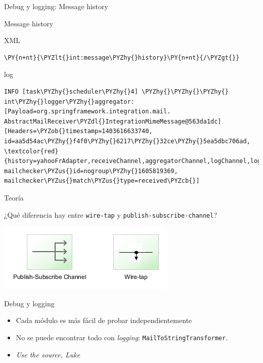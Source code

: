 \documentclass{beamer}
\begin{document}
\begin{frame}[fragile]{Debug y logging: Message history}
\begin{center}
Message history
\end{center}
{\small XML}
\begin{Verbatim}[fontsize=\tiny,commandchars=\\\{\}]
\PY{n+nt}{\PYZlt{}int:message\PYZhy{}history}\PY{n+nt}{/\PYZgt{}}
\end{Verbatim}

{\small log}
\begin{Verbatim}[fontsize=\tiny,commandchars=\\\{\}]
INFO [task\PYZhy{}scheduler\PYZhy{}4] \PYZhy{}\PYZhy{}\PYZhy{} int\PYZhy{}logger\PYZhy{}aggregator: [Payload=org.springframework.integration.mail.
AbstractMailReceiver\PYZdl{}IntegrationMimeMessage@563da1dc][Headers=\PYZob{}timestamp=1403616633740, id=aa5d54ac\PYZhy{}f4f0\PYZhy{}6217\PYZhy{}32ce\PYZhy{}5ea5dbc706ad,
\textcolor{red}{history=yahooFrAdapter,receiveChannel,aggregatorChannel,logChannel,logChannel.adapter},
mailchecker\PYZus{}id=nogroup\PYZhy{}1605819369, mailchecker\PYZus{}match\PYZus{}type=received\PYZcb{}]
\end{Verbatim}
\end{frame}

\begin{frame}[fragile]{Teoría}
\begin{center}
¿Qué diferencia hay entre \verb|wire-tap| y \verb|publish-subscribe-channel|?
\end{center}
\begin{center}
\includegraphics[width=0.5\linewidth]{sp-int-20}
\end{center}
\end{frame}

\begin{frame}[fragile]{Debug y logging}
\begin{itemize}[<+->]
\item Cada módulo es más fácil de probar independientemente 
\item No se puede encontrar todo con \textit{logging}: \verb|MailToStringTransformer|.
\item \textit{Use the source, Luke} 
\end{itemize}
\end{frame}
\end{document}
